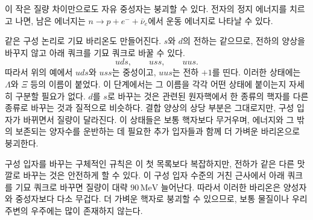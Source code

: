 \begin{classroomqa}
\end{classroomqa}

이 작은 질량 차이만으로도 자유 중성자는 붕괴할 수 있다. 전자의 정지 에너지를 치르고 나면, 남은 에너지는 \(n\to p+e^-+\bar\nu_e\)에서 운동 에너지로 나타날 수 있다.

같은 구성 논리로 기묘 바리온도 만들어진다. \(s\)와 \(d\)의 전하는 같으므로, 전하의 양상을 바꾸지 않고 아래 쿼크를 기묘 쿼크로 바꿀 수 있다.
\begin{equation}
uds,\qquad uss,\qquad uus.
\end{equation}
따라서 위의 예에서 \(uds\)와 \(uss\)는 중성이고, \(uus\)는 전하 \(+1\)를 띤다. 이러한 상태에는 \(\Lambda\)와 \(\Xi\) 등의 이름이 붙었다. 이 단계에서는 그 이름을 각각 어떤 상태에 붙이는지 자세히 구분할 필요가 없다. \(d\)를 \(s\)로 바꾸는 것은 관련된 원자핵에서 한 종류의 핵자를 다른 종류로 바꾸는 것과 질적으로 비슷하다. 결합 양상의 상당 부분은 그대로지만, 구성 입자가 바뀌면서 질량이 달라진다. 이 상태들은 보통 핵자보다 무거우며, 에너지와 그 밖의 보존되는 양자수를 운반하는 데 필요한 추가 입자들과 함께 더 가벼운 바리온으로 붕괴한다.

\begin{classroomqa}
\end{classroomqa}

구성 입자를 바꾸는 구체적인 규칙은 이 첫 목록보다 복잡하지만, 전하가 같은 다른 맛깔로 바꾸는 것은 안전하게 할 수 있다. 이 구성 입자 수준의 거친 근사에서 아래 쿼크를 기묘 쿼크로 바꾸면 질량이 대략 \(90\,\mathrm{MeV}\) 늘어난다. 따라서 이러한 바리온은 양성자와 중성자보다 다소 무겁다. 더 가벼운 핵자로 붕괴할 수 있으므로, 보통 물질이나 우리 주변의 우주에는 많이 존재하지 않는다.

\begin{classroomqa}
\end{classroomqa}

